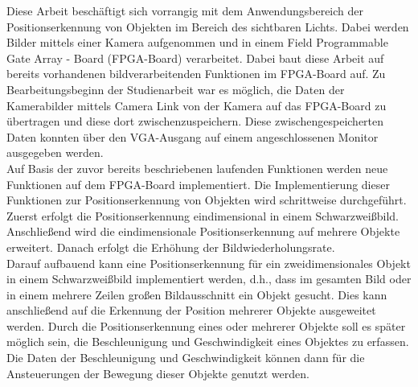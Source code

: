\documentclass[ngerman,12pt]{article} %
\begin{document}
Diese Arbeit beschäftigt sich vorrangig mit dem Anwendungsbereich der Positionserkennung von Objekten im Bereich des sichtbaren Lichts. Dabei werden Bilder mittels einer Kamera aufgenommen und in einem Field Programmable Gate Array - Board (FPGA-Board) verarbeitet. Dabei baut diese Arbeit auf bereits vorhandenen bildverarbeitenden Funktionen im FPGA-Board auf. Zu Bearbeitungsbeginn der Studienarbeit war es möglich, die Daten der Kamerabilder mittels Camera Link von der Kamera auf das FPGA-Board zu übertragen und diese dort zwischenzuspeichern. Diese zwischengespeicherten Daten konnten über den VGA-Ausgang auf einem angeschlossenen Monitor ausgegeben werden.\\
Auf Basis der zuvor bereits beschriebenen laufenden Funktionen werden neue Funktionen auf dem FPGA-Board implementiert. Die Implementierung dieser Funktionen zur Positionserkennung von Objekten wird schrittweise durchgeführt. Zuerst erfolgt die Positionserkennung eindimensional in einem Schwarzweißbild. Anschließend wird die eindimensionale Positionserkennung auf mehrere Objekte erweitert. Danach erfolgt die Erhöhung der Bildwiederholungsrate.\\
Darauf aufbauend kann eine Positionserkennung für ein zweidimensionales Objekt in einem Schwarzweißbild implementiert werden, d.h., dass im gesamten Bild oder in einem mehrere Zeilen großen Bildausschnitt ein Objekt gesucht. Dies kann anschließend auf die Erkennung der Position mehrerer Objekte ausgeweitet werden. Durch die Positionserkennung eines oder mehrerer Objekte soll es später möglich sein, die Beschleunigung und Geschwindigkeit eines Objektes zu erfassen. Die Daten der Beschleunigung und Geschwindigkeit können dann für die Ansteuerungen der Bewegung dieser Objekte genutzt werden.\newline
\end{document}
